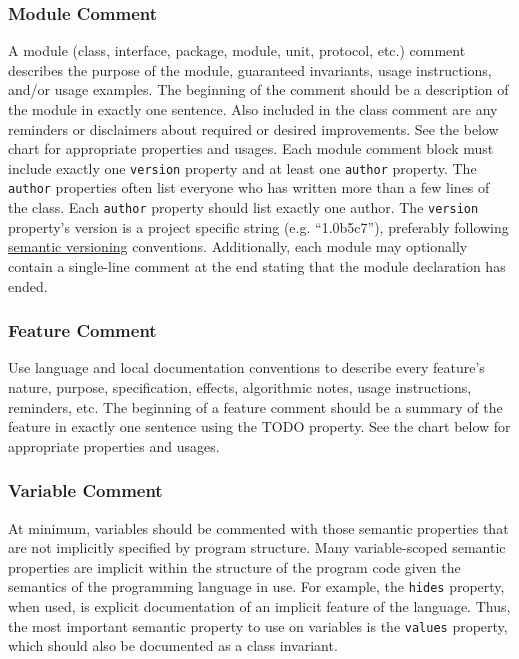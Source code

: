 \documentclass[10pt,letter]{article}
\begin{document}
\subsubsection{Module Comment}

A module (class, interface, package, module, unit, protocol, etc.) comment describes the purpose of the module, guaranteed invariants, usage instructions, and/or usage examples. The beginning of the comment should be a description of the module in exactly one sentence. Also included in the class comment are any reminders or disclaimers about required or desired improvements. See the below chart for appropriate properties and usages.
Each module comment block must include exactly one \texttt{version} property and at least one \texttt{author} property. The \texttt{author} properties often list everyone who has written more than a few lines of the class. Each \texttt{author} property should list exactly one author. The \texttt{version} property's version is a project specific string (e.g. ``1.0b5c7''), preferably following \href{https://semver.org/}{semantic versioning} conventions. Additionally, each module may optionally contain a single-line comment at the end stating that the module declaration has ended.

\subsubsection{Feature Comment}

Use language and local documentation conventions to describe every feature’s nature, purpose, specification, effects, algorithmic notes, usage instructions, reminders, etc. The beginning of a feature comment should be a summary of the feature in exactly one sentence using the  TODO property. See the chart below for appropriate properties and usages.

\subsubsection{Variable Comment}

At minimum, variables should be commented with those semantic properties that are not implicitly specified by program structure. Many variable-scoped semantic properties are implicit within the structure of the program code given the semantics of the programming language in use. For example, the \texttt{hides} property, when used, is explicit documentation of an implicit feature of the language. Thus, the most important semantic property to use on variables is the \texttt{values} property, which should also be documented as a class invariant.
\end{document}
